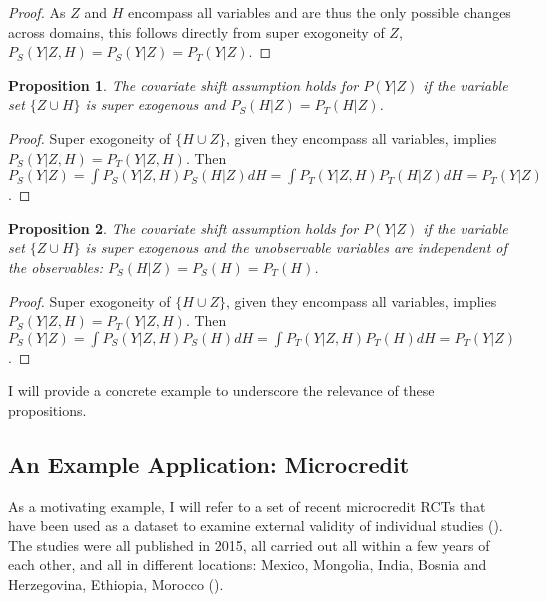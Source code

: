 \documentclass[a4paper,12pt]{article}
\newtheorem{prop}{Proposition}
\begin{document}
\begin{proof}
As $Z$ and $H$ encompass all variables and are thus the only possible changes across domains, this follows directly from super exogoneity of $Z$, $P_S(Y|Z, H) = P_S(Y | Z) = P_T(Y | Z)$.
\end{proof}

\begin{prop}
  The covariate shift assumption holds for $P(Y|Z)$ if the variable set $\{ Z \cup H \}$ is super exogenous and $P_S(H|Z) = P_T(H|Z)$.
\end{prop}

\begin{proof}
  Super exogoneity of $\{H \cup Z \}$, given they encompass all variables, implies $P_S(Y|Z,H) = P_T(Y|Z,H)$. Then $P_S(Y|Z) = \int P_S(Y|Z,H)P_S(H|Z) dH = \int P_T(Y|Z,H)P_T(H|Z) dH = P_T(Y|Z)$.
\end{proof}

\begin{prop}
  The covariate shift assumption holds for $P(Y|Z)$ if the variable set $\{ Z \cup H \}$ is super exogenous and the unobservable variables are independent of the observables: $P_S(H|Z) = P_S(H) = P_T(H)$.
\end{prop}

\begin{proof}
  Super exogoneity of $\{H \cup Z \}$, given they encompass all variables, implies $P_S(Y|Z,H) = P_T(Y|Z,H)$. Then $P_S(Y|Z) = \int P_S(Y|Z,H)P_S(H) dH = \int P_T(Y|Z,H)P_T(H) dH = P_T(Y|Z)$.
\end{proof}



I will provide a concrete example to underscore the relevance of these propositions.

\subsection{An Example Application: Microcredit}

As a motivating example, I will refer to a set of recent microcredit RCTs that have been used as a dataset to examine external validity of individual studies (\cite{Pritchett2016, Meager2018}). The studies were all published in 2015, all carried out all within a few years of each other, and all in different locations: Mexico, Mongolia, India, Bosnia and Herzegovina, Ethiopia, Morocco (\cite{Attanasio2015, Angelucci2015, Augsburg2015, Banerjee2015, Crepon2015, Tarozzi2015}).
\end{document}
